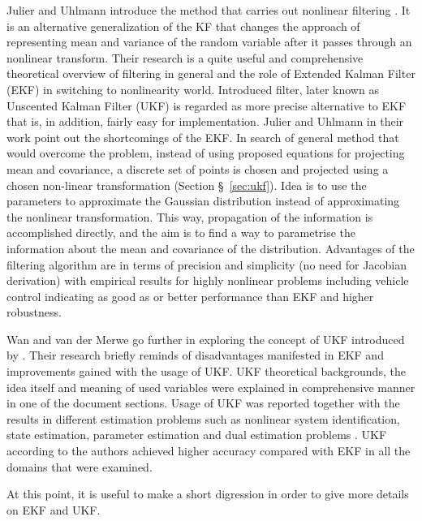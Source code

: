 Julier and Uhlmann introduce the method that carries out nonlinear filtering \cite{julier96}. It is an alternative generalization of the KF that changes the approach of representing mean and variance of the random variable after it passes through an nonlinear transform. Their research is a quite useful and comprehensive theoretical overview of filtering in general and the role of Extended Kalman Filter (EKF) in switching to nonlinearity world. Introduced filter, later known as Unscented Kalman Filter (UKF) is regarded as more precise alternative to EKF that is, in addition, fairly easy for implementation. Julier and Uhlmann in their work point out the shortcomings of the EKF. In search of general method that would overcome the problem, instead of using proposed equations for projecting mean and covariance, a discrete set of points is chosen and projected using a chosen non-linear transformation (Section \S~\ref{sec:ukf}). Idea is to use the parameters to approximate the Gaussian distribution instead of approximating the nonlinear transformation. This way, propagation of the information is accomplished directly, and the aim is to find a way to parametrise the information about the mean and covariance of the distribution. Advantages of the filtering algorithm are in terms of precision and simplicity (no need for Jacobian derivation) with empirical results for highly nonlinear problems including vehicle control indicating as good as or better performance than EKF and higher robustness.

Wan and van der Merwe \cite{wan00} go further in exploring the concept of UKF introduced by \cite{julier96}. Their research briefly reminds of disadvantages manifested in EKF and improvements gained with the usage of UKF. UKF theoretical backgrounds, the idea itself and meaning of used variables were explained in comprehensive manner in one of the document sections. Usage of UKF was reported together with the results in different estimation problems such as nonlinear system identification, state estimation, parameter estimation and dual estimation problems \cite{wan00}. UKF according to the authors achieved higher accuracy compared with EKF in all the domains that were examined.

At this point, it is useful to make a short digression in order to give more details on EKF and UKF.

